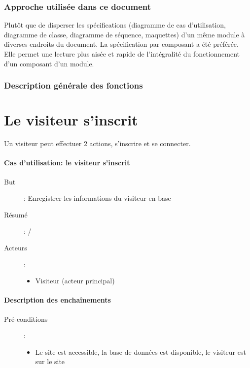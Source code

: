 \documentclass[a4paper,12pt]{report}
\begin{document}
\begin{onehalfspace}
\subsection{Approche utilisée dans ce document} %
\label{sub:approche_utilis_e_dans_ce_document}
Plutôt que de disperser les spécifications (diagramme de cas d’utilisation, diagramme de classe, diagramme de séquence, maquettes) d’un même module à diverses endroits du document. La spécification par composant a été préférée. Elle permet une lecture plus aisée et rapide de l’intégralité du fonctionnement d’un composant d’un module.

\subsection{Description générale des fonctions} %
\label{sub:description_g_n_rale_des_fonctions}

\chapter{Le visiteur s’inscrit}
Un visiteur peut effectuer 2 actions, s’inscrire et se connecter.

\subsubsection{Cas d'utilisation: le visiteur s'inscrit} %
\begin{description}
  \item[But]: Enregistrer les informations du visiteur en base
  \item[Résumé]: /
  \item[Acteurs]:
    \begin{itemize}
      \item Visiteur (acteur principal)
    \end{itemize}
\end{description}

\subsubsection{Description des enchaînements} %
\label{sub:description_des_encha_nements}

\begin{description}
  \item[Pré-conditions]:
    \begin{itemize}
      \item Le site est accessible, la base de données est disponible, le visiteur est sur le site
    \end{itemize}


\end{description}
\end{onehalfspace}
\end{document}
